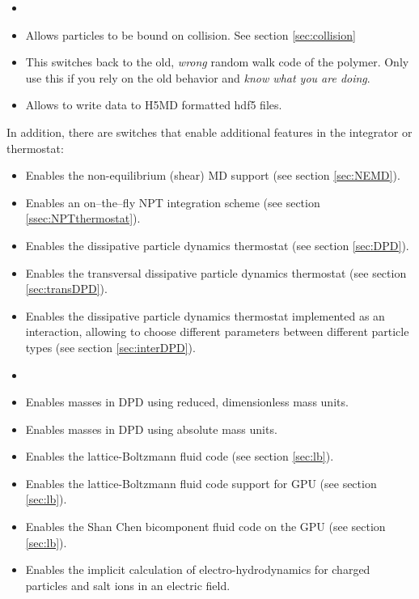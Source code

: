 \begin{itemize}
\item {}
\item {} Allows particles to be bound on collision. See section \ref{sec:collision}
\item {} This switches back to the old,
  \emph{wrong} random walk code of the polymer. Only use this if you
  rely on the old behavior and \emph{know what you are doing}.
\item {} Allows to write data to H5MD formatted hdf5 files.
\end{itemize}

In addition, there are switches that enable additional features in the
integrator or thermostat:
\begin{itemize}
\item {} Enables the non-equilibrium (shear) MD support
  (see section \vref{sec:NEMD}).
\item {} Enables an on--the--fly NPT integration scheme
  (see section \vref{ssec:NPTthermostat}).
\item {} Enables the dissipative particle dynamics
  thermostat (see section \vref{sec:DPD}).
\item {} Enables the transversal dissipative
  particle dynamics thermostat (see section \vref{sec:transDPD}).
\item {} Enables the dissipative
  particle dynamics thermostat implemented as an interaction,
  allowing to choose different parameters between different particle
  types (see section \vref{sec:interDPD}).
\item {} 
\item {} Enables masses in DPD using reduced,
  dimensionless mass units.
\item {} Enables masses in DPD using absolute
  mass units.
\item {} Enables the lattice-Boltzmann fluid code (see
  section \vref{sec:lb}).
\item {} Enables the lattice-Boltzmann fluid code support for GPU (see
  section \vref{sec:lb}).
\item {} Enables the Shan Chen bicomponent fluid code on the GPU (see
  section \vref{sec:lb}).
\item {} Enables the implicit
  calculation of electro-hydrodynamics for charged particles and salt
  ions in an electric field.
  
\end{itemize}

